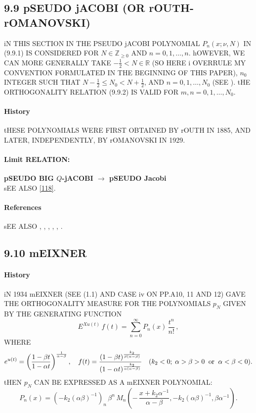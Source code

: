 \documentclass[twoside,11pt]{article}
\newcommand\RR{\mathbb{R}}
\newcommand\ZZ{\mathbb{Z}}
\newcommand\al\alpha
\newcommand\be\beta
\newcommand\thalf{\tfrac12}
\newcommand\iy\infty
\begin{document}
\subsection*{9.9 pSEUDO jACOBI (OR rOUTH-rOMANOVSKI)} 
\label{sec9.9} 
iN THIS SECTION IN  THE PSEUDO jACOBI POLYNOMIAL $P_n(x;\nu,N)$ IN (9.9.1) 
IS CONSIDERED 
FOR $N\in\ZZ_{\ge0}$ AND $n=0,1,\ldots,n$. hOWEVER, WE CAN MORE GENERALLY TAKE 
$-\thalf<N\in\RR$ (SO HERE i OVERRULE MY CONVENTION FORMULATED IN THE 
BEGINNING OF THIS PAPER), $n_0$ INTEGER SUCH THAT $N-\thalf\le N_0<N+\thalf$, AND $n=0,1,\ldots,N_0$ 
(SEE ). tHE ORTHOGONALITY RELATION (9.9.2) 
IS VALID FOR $m,n=0,1,\ldots,N_0$. 
% 
\paragraph{History} 
tHESE POLYNOMIALS WERE FIRST OBTAINED BY rOUTH \cite{K13} IN 1885, AND LATER, INDEPENDENTLY, 
BY rOMANOVSKI  IN 1929. 
% 
\paragraph{Limit RELATION:} 
{\bf pSEUDO BIG $Q$-jACOBI $\longrightarrow$ pSEUDO Jacobi}\\ 
sEE ALSO \eqref{118}. 
% 
\paragraph{References} 
sEE ALSO , , 
, \cite{K11}, \cite{K10}, \cite{K12}. 
% 
\subsection*{9.10 mEIXNER} 
\label{sec9.10} 
\paragraph{History} 
iN 1934 mEIXNER  (SEE 
(1.1) AND CASE iv ON PP.A10, 11 AND 12) GAVE THE ORTHOGONALITY 
MEASURE FOR THE POLYNOMIALS $p_N$ GIVEN BY THE GENERATING FUNCTION 
\[ 
E^{X u(t)}\,f(t)=\sum_{n=0}^\iy P_n(x)\,\frac{t^n}{n!}\,, 
\] 
WHERE 
\[ 
e^{u(t)}=\left(\frac{1-\be t}{1-\al t}\right)^{\frac1{\al-\be}},\quad 
f(t)=\frac{(1-\be t)^{\frac{k_2}{\be(\al-\be)}}}{(1-\al t)^{\frac{k_2}{\al(\al-\be)}}}\quad 
(k_2<0;\;\al>\be>0\;\;{\rm or}\;\;\al<\be<0). 
\] 
tHEN $p_N$ CAN BE EXPRESSED AS A mEIXNER POLYNOMIAL: 
\[ 
P_n(x)=(-k_2(\al\be)^{-1})_n\,\be^n\, 
M_n\left(-\,\frac{x+k_2\al^{-1}}{\al-\be},-k_2(\al\be)^{-1},\be\al^{-1}\right). 
\] 
 
\end{document}
